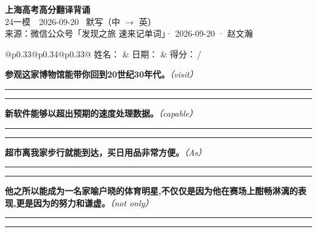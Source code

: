 \documentclass[11pt,a4paper]{article}
\newcommand{\num}[1]{\makebox[1.9em][r]{#1.}\hspace{0.3em}}
\newcommand{\wline}{\noindent\rule{\linewidth}{0.4pt}}
\newcommand{\prompt}[1]{\emph{\textcolor{tipblue}{\small（#1）}}}
\begin{document}
\pagestyle{plain}
\begin{center}
{\LARGE\bfseries 上海高考高分翻译背诵 }\\[0.25em]
{\large 24一模　2026-09-20 \quad\ 默写（中 $\to$ 英）}\\[0.35em]
{\footnotesize 来源：微信公众号「发现之旅 速来记单词」· 2026-09-20 · 赵文瀚}
\end{center}

\vspace{0.4em}
\noindent\begin{tabular}{@{}p{0.33\textwidth}@{}p{0.34\textwidth}@{}p{0.33\textwidth}@{}}
姓名：\underline{\hspace{2.0cm}} & 日期：\underline{\hspace{2.0cm}} & 得分：\underline{\hspace{1.4cm}}\,/ \\
\end{tabular}

\vspace{0.5em}

\vspace{0.8em}
\num{1}\textbf{参观这家博物馆能带你回到20世纪30年代。}\prompt{visit}

\vspace{0.3em}

\wline\vspace{0.3em}
\wline

\num{2}\textbf{新软件能够以超出预期的速度处理数据。}\prompt{capable}

\vspace{0.3em}

\wline\vspace{0.3em}
\wline

\num{3}\textbf{超市离我家步行就能到达，买日用品非常方便。}\prompt{As}

\vspace{0.3em}

\wline\vspace{0.3em}
\wline

\num{4}\textbf{他之所以能成为一名家喻户晓的体育明星,不仅仅是因为他在赛场上酣畅淋漓的表现,更是因为的努力和谦虚。}\prompt{not only}

\vspace{0.3em}

\wline\vspace{0.3em}
\wline
\end{document}

